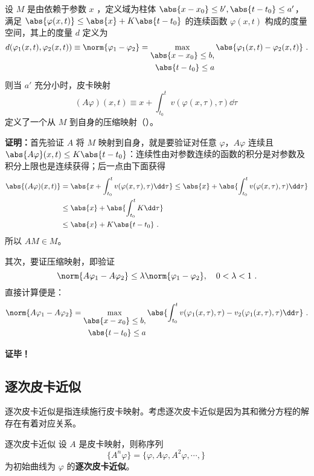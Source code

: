 \begin{theorem}{}
设 $M$ 是由依赖于参数 $x$ ，定义域为柱体 $\abs{x-x_0}\leq b',\abs{t-t_0}\leq a'$，满足 $\abs{\varphi(x,t)}\leq \abs{x}+K\abs{t-t_0}$ 的连续函数 $\varphi(x,t)$ 构成的度量空间，其上的度量 $d$ 定义为
\begin{equation}
d(\varphi_1(x,t),\varphi_2(x,t))\equiv\norm{\varphi_1-\varphi_2}=\max_{\begin{aligned}\abs{x-x_0}\leq b,\\\abs{t-t_0}\leq a\end{aligned}}\abs{\varphi_1(x,t)-\varphi_2(x,t)}~.
\end{equation}
则当 $a'$ 充分小时，皮卡映射
\begin{equation}
(A\varphi)(x,t)\equiv x+\int_{t_0}^{t}v(\varphi(x,\tau),\tau)\dd \tau~
\end{equation}
定义了一个从 $M$ 到自身的压缩映射（）。
\end{theorem}
\textbf{证明：}首先验证 $A$ 将 $M$ 映射到自身，就是要验证对任意 $\varphi$，$A\varphi$ 连续且 $\abs{A\varphi}(x,t)\leq K\abs{t-t_0}$：连续性由对参数连续的函数的积分是对参数及积分上限也是连续获得；后一点由下面获得
\begin{equation}
\begin{aligned}
\abs{(A\varphi)(x,t)}&=\abs{x+\int_{t_0}^t v(\varphi(x,\tau),\tau)\dd \tau}\leq\abs{x}+\abs{\int_{t_0}^t v(\varphi(x,\tau),\tau)\dd \tau}\\
&\leq\abs{x}+\abs{\int_{t_0}^t K\dd \tau}\\
&\leq\abs{x}+K\abs{t-t_0}~.
\end{aligned}
\end{equation}
所以 $AM\in M$。

其次，要证压缩映射，即验证 
\begin{equation}
\norm{A\varphi_1-A\varphi_2}\leq\lambda\norm{\varphi_1-\varphi_2},\quad 0<\lambda<1~.
\end{equation}
直接计算便是：
\begin{equation}
\begin{aligned}
\norm{A\varphi_1-A\varphi_2}=\max_{\begin{aligned}\abs{x-x_0}\leq b,\\\abs{t-t_0}\leq a\end{aligned}}\abs{\int_{t_0}^t v(\varphi_1(x,\tau),\tau)-v_2(\varphi_1(x,\tau),\tau)\dd \tau}~.
\end{aligned}
\end{equation}


\textbf{证毕！}
\subsection{逐次皮卡近似}
逐次皮卡近似是指连续施行皮卡映射。考虑逐次皮卡近似是因为其和微分方程的解存在有着对应关系。
\begin{definition}{逐次皮卡近似}
设 $A$ 是皮卡映射，则称序列
\begin{equation}
\{A^n\varphi\}=\{\varphi, A\varphi, A^2\varphi,\cdots,\}~ 
\end{equation}
为初始曲线为 $\varphi$ 的\textbf{逐次皮卡近似}。
\end{definition}

